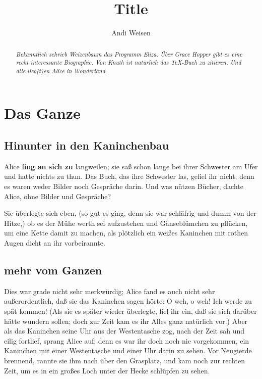 \documentclass[DIV=calc,10pt,parskip=half,twocolumn]{article}
\author{Andi Weisen}
\begin{document}
\title{
\vspace{-1.5em}
\Huge Title
\vspace{-2.5em}
}
\author{}
\date{}


\maketitle

\begin{abstract}\itshape %
  \color{seagreen}
  Bekanntlich schrieb \glqq Weizenbaum\grqq{} das Programm Eliza. 
Über Grace Hopper gibt es eine recht interessante Biographie.  
Von Knuth ist natürlich das \TeX{}-Buch zu zitieren. 
Und alle lieb(t)en \emph{Alice in Wonderland}. 
\end{abstract} 


\section{Das Ganze}
\subsection{Hinunter in den Kaninchenbau}

Alice {\bfseries fing an sich zu} langweilen; sie saß schon lange bei ihrer Schwester am
Ufer und hatte nichts zu thun. Das Buch, das ihre Schwester las, gefiel ihr
nicht; denn es waren weder Bilder noch Gespräche darin. \grqq{} Und was nützen
Bücher,\grqq{}  dachte Alice, \grqq{}ohne Bilder und Gespräche?\grqq 

Sie überlegte sich eben, (so gut es ging, denn sie war schläfrig und dumm von
der Hitze,) ob es der Mühe werth sei aufzustehen und Gänseblümchen zu pflücken,
um eine Kette damit zu machen, als plötzlich ein weißes Kaninchen mit rothen
Augen dicht an ihr vorbeirannte.

\subsection{mehr vom Ganzen}

Dies war grade nicht sehr merkwürdig; Alice fand es auch nicht sehr
außerordentlich, daß sie das Kaninchen sagen hörte: \grqq{} O weh, o weh! Ich werde zu
spät kommen!\grqq{}  (Als sie es später wieder überlegte, fiel ihr ein, daß sie sich
darüber hätte wundern sollen; doch zur Zeit kam es ihr Alles ganz natürlich
vor.) Aber als das Kaninchen seine Uhr aus der Westentasche zog, nach der Zeit
sah und eilig fortlief, sprang Alice auf; denn es war ihr doch noch nie
vorgekommen, ein Kaninchen mit einer Westentasche und einer Uhr darin zu sehen.
Vor Neugierde brennend, rannte sie ihm nach über den Grasplatz, und kam noch
zur rechten Zeit, um es in ein großes Loch unter der Hecke schlüpfen zu sehen.
\end{document}
